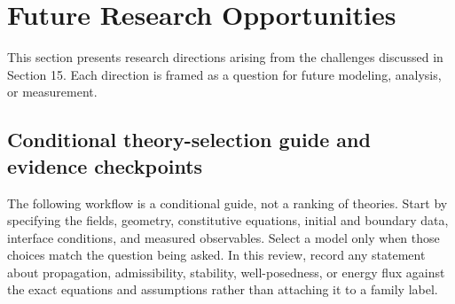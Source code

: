 \section{Future Research Opportunities}
\label{sec:future}

This section presents research directions arising from the challenges discussed in Section 15. Each direction is framed as a question for future modeling, analysis, or measurement.

\subsection{Conditional theory-selection guide and evidence checkpoints}
\label{sec:selection-guide}

The following workflow is a conditional guide, not a ranking of theories. Start by specifying the fields, geometry, constitutive equations, initial and boundary data, interface conditions, and measured observables. Select a model only when those choices match the question being asked. In this review, record any statement about propagation, admissibility, stability, well-posedness, or energy flux against the exact equations and assumptions rather than attaching it to a family label.

